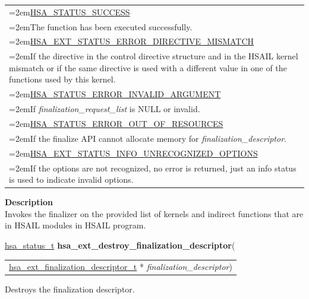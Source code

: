 \documentclass[final]{book}
\newcommand{\hsaarg}[1]{\textit{#1}}
\begin{document}
\noindent\begin{longtable}{@{}>{\hangindent=2em}p{\linewidth}}
\hyperlink{group__status_1ggad755322e7ff95456520e8abdbe90d225ae382ea0c9c05cce5a60d0317375159cc}{HSA_STATUS_SUCCESS}\\\hspace{2em}The function has been executed successfully.\\[2mm]
\hyperlink{group__status_1ggad755322e7ff95456520e8abdbe90d225ae16bcc443d027a0b880fd58f0443227b}{HSA_EXT_STATUS_ERROR_DIRECTIVE_MISMATCH}\\\hspace{2em}If the directive in the control directive structure and in the HSAIL kernel mismatch or if the same directive is used with a different value in one of the functions used by this kernel.\\[2mm]
\hyperlink{group__status_1ggad755322e7ff95456520e8abdbe90d225ac7d3651f75107d2a6a8ba3b25683c030}{HSA_STATUS_ERROR_INVALID_ARGUMENT}\\\hspace{2em}If \textit{finalization_request_list} is NULL or invalid.\\[2mm]
\hyperlink{group__status_1ggad755322e7ff95456520e8abdbe90d225a1a77fcf36d0d140874c4361ab093eff7}{HSA_STATUS_ERROR_OUT_OF_RESOURCES}\\\hspace{2em}If the finalize API cannot allocate memory for \textit{finalization_descriptor}.\\[2mm]
\hyperlink{group__status_1ggad755322e7ff95456520e8abdbe90d225a60343279bea68766b037297915b5f903}{HSA_EXT_STATUS_INFO_UNRECOGNIZED_OPTIONS}\\\hspace{2em}If the options are not recognized, no error is returned, just an info status is used to indicate invalid options.
\end{longtable}
\vspace{-4mm}\noindent\textbf{Description}\\[1mm]
Invokes the finalizer on the provided list of kernels and indirect functions that are in HSAIL modules in HSAIL program. 


\noindent\begin{tcolorbox}[breakable,nobeforeafter,colframe=white,colback=lightgray,left=0mm]
\hyperlink{group__status_1gad755322e7ff95456520e8abdbe90d225}{hsa_status_t} \hypertarget{group__FinalizerCoreApi_1ga2e8497371521b4cdfd4c795dce98b840}{\textbf{hsa_ext_destroy_finalization_descriptor}}(
\vspace{-3.5mm}\begin{longtable}{@{}p{\textwidth}}
\hspace{1.7em}\hyperlink{group__FinalizerCoreApi_1ga891145420d6ee58bf56b59c557101b88}{hsa_ext_finalization_descriptor_t} * \hsaarg{finalization_descriptor})\end{longtable}

\end{tcolorbox}
Destroys the finalization descriptor.
\end{document}
